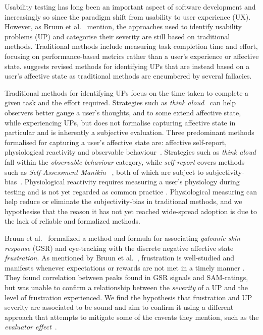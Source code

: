 Usability testing has long been an important aspect of software development and
increasingly so since the paradigm shift from usability to user experience (UX).
However, as Bruun et al.~\cite{LH-paper} mention, the approaches used to
identify usability problems (UP) and categorise their severity are still based
on traditional methods. Traditional methods include measuring task completion
time and effort, focusing on performance-based metrics rather than a user's
experience or affective state. \cite{LH-paper} suggests revised methods
for identifying UPs that are instead based on a user's affective state as
traditional methods are encumbered by several fallacies.


Traditional methods for identifying UPs focus on the time taken to complete a
given task and the effort required. Strategies such as \textit{think
aloud}~\cite{use_of_TA_and_IDA} can help observers better gauge a user's
thoughts, and to some extend affective state, while experiencing UPs, but does
not formalise capturing affective state in particular and is inherently a
subjective evaluation. Three predominant methods formalised for capturing a
user's affective state are: affective self-report, physiological reactivity and
observable behaviour~\cite{BRADLEY199449}. Strategies such as \textit{think
aloud} fall within the \textit{observable behaviour} category, while
\textit{self-report} covers methods such as \textit{Self-Assessment Manikin}
~\cite{BRADLEY199449}, both of which are subject to
subjectivity-bias~.  Physiological reactivity requires measuring a
user's physiology during testing and is not yet regarded as common practice
.  Physiological measuring can help reduce or
eliminate the subjectivity-bias in traditional methods, and we hypothesise that
the reason it has not yet reached wide-spread adoption is due to the lack of
reliable and formalized methods.

Bruun et al.~\cite{LH-paper} formalized a method and formula for associating
\textit{galvanic skin response} (GSR) and eye-tracking with the discrete
negative affective state \textit{frustration}. As mentioned by Bruun et al.~\cite{LH-paper}, frustration is well-studied
and manifests whenever expectations or rewards are not met in a timely manner
. They found correlation between peaks found in GSR signals and
SAM-ratings, but was unable to confirm a relationship between the
\textit{severity} of a UP and the level of frustration experienced. We find the
hypothesis that frustration and UP severity are associated to be sound and aim
to confirm it using a different approach that attempts to mitigate some of the
caveats they mention, such as the \textit{evaluator effect}~\cite{eval_effect}.

